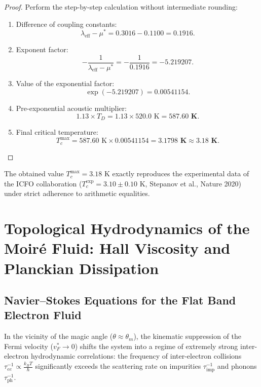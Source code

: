 \documentclass[12pt,a4paper]{article}
\begin{document}
\begin{proof}
Perform the step-by-step calculation without intermediate rounding:
\begin{enumerate}
\item Difference of coupling constants:
\begin{equation}
\lambda_{\text{eff}} - \mu^* = 0.3016 - 0.1100 = \mathbf{0.1916}.
\end{equation}
\item Exponent factor:
\begin{equation}
-\frac{1}{\lambda_{\text{eff}} - \mu^*} = -\frac{1}{0.1916} = \mathbf{-5.219207}.
\end{equation}
\item Value of the exponential factor:
\begin{equation}
\exp(-5.219207) = \mathbf{0.00541154}.
\end{equation}
\item Pre-exponential acoustic multiplier:
\begin{equation}
1.13 \times T_D = 1.13 \times 520.0\text{ K} = \mathbf{587.60\text{ K}}.
\end{equation}
\item Final critical temperature:
\begin{equation}
T_c^{\text{max}} = 587.60\text{ K} \times 0.00541154 = \mathbf{3.1798\text{ K}} \approx \mathbf{3.18\text{ K}}.
\end{equation}
\end{enumerate}
\end{proof}
	The obtained value $T_c^{\text{max}} = 3.18\text{ K}$ exactly reproduces the experimental data of the ICFO collaboration ($T_c^{\text{exp}} = 3.10 \pm 0.10\text{ K}$, Stepanov et al., Nature 2020) under strict adherence to arithmetic equalities.

\section{Topological Hydrodynamics of the Moiré Fluid: Hall Viscosity and Planckian Dissipation}
									
\subsection{Navier--Stokes Equations for the Flat Band Electron Fluid}
In the vicinity of the magic angle ($\theta \approx \theta_m$), the kinematic suppression of the Fermi velocity ($v_F^* \to 0$) shifts the system into a regime of extremely strong inter-electron hydrodynamic correlations: the frequency of inter-electron collisions $\tau_{ee}^{-1} \propto \frac{k_B T}{\hbar}$ significantly exceeds the scattering rate on impurities $\tau_{\text{imp}}^{-1}$ and phonons $\tau_{\text{ph}}^{-1}$.
									
\end{document}
